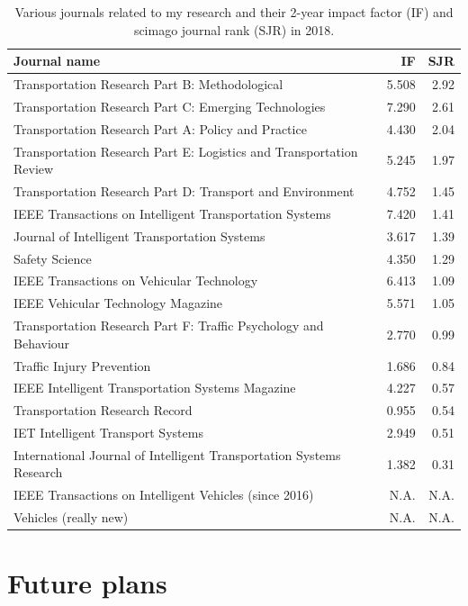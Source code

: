 \documentclass[10pt,final,a4paper,oneside,onecolumn]{article}
\newcommand{\otoprule}{\midrule[\heavyrulewidth]}
\begin{document}
\begin{table}[b!]
	\centering
	\caption{Various journals related to my research and their 2-year impact factor (IF) and scimago journal rank (SJR) in 2018.}
	\label{tab:journals}
	\begin{tabular}{lrr}
		\toprule
		Journal name & IF & SJR \\ \otoprule
		Transportation Research Part B: Methodological	& 5.508	& 2.92 \\
		Transportation Research Part C: Emerging Technologies &	7.290 & 2.61 \\
		Transportation Research Part A: Policy and Practice &	4.430 &	2.04\\
		Transportation Research Part E: Logistics and Transportation Review &	5.245 &	1.97\\
		Transportation Research Part D: Transport and Environment &	4.752 &	1.45\\
		IEEE Transactions on Intelligent Transportation Systems &	7.420 &	1.41\\
		Journal of Intelligent Transportation Systems &	3.617 &	1.39\\
		Safety Science &	4.350 &	1.29\\
		IEEE Transactions on Vehicular Technology &	6.413 &	1.09\\
		IEEE Vehicular Technology Magazine &	5.571 &	1.05\\
		Transportation Research Part F: Traffic Psychology and Behaviour &	2.770 &	0.99\\
		Traffic Injury Prevention &	1.686 &	0.84\\
		IEEE Intelligent Transportation Systems Magazine &	4.227 &	0.57\\
		Transportation Research Record &	0.955 &	0.54\\
		IET Intelligent Transport Systems &	2.949 &	0.51\\
		International Journal of Intelligent Transportation Systems Research &	1.382 &	0.31\\
		IEEE Transactions on Intelligent Vehicles (since 2016) & N.A. & N.A. \\	
		Vehicles (really new)& N.A. & N.A. \\
		\bottomrule
	\end{tabular}
\end{table}
	


\section{Future plans}
\end{document}
